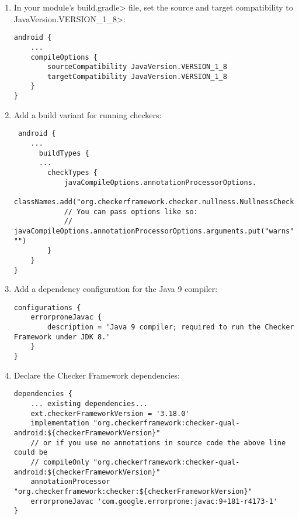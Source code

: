 \begin{enumerate}

\item In your module's \<build.gradle> file, set the source and target
  compatibility to \<JavaVersion.VERSION\_1\_8>:

\begin{Verbatim}
android {
    ...
    compileOptions {
        sourceCompatibility JavaVersion.VERSION_1_8
        targetCompatibility JavaVersion.VERSION_1_8
    }
}
\end{Verbatim}

\item Add a build variant for running checkers:

 \begin{Verbatim}
 android {
    ...
      buildTypes {
      ...
        checkTypes {
            javaCompileOptions.annotationProcessorOptions.
                    classNames.add("org.checkerframework.checker.nullness.NullnessChecker")
            // You can pass options like so:
            // javaCompileOptions.annotationProcessorOptions.arguments.put("warns", "")
        }
    }
}
\end{Verbatim}

\item Add a dependency configuration for the Java 9 compiler:

\begin{mysmall}
\begin{Verbatim}
configurations {
    errorproneJavac {
        description = 'Java 9 compiler; required to run the Checker Framework under JDK 8.'
    }
}

\end{Verbatim}
\end{mysmall}

\item Declare the Checker Framework dependencies:

\begin{mysmall}
\begin{Verbatim}
dependencies {
    ... existing dependencies...
    ext.checkerFrameworkVersion = '3.18.0'
    implementation "org.checkerframework:checker-qual-android:${checkerFrameworkVersion}"
    // or if you use no annotations in source code the above line could be
    // compileOnly "org.checkerframework:checker-qual-android:${checkerFrameworkVersion}"
    annotationProcessor "org.checkerframework:checker:${checkerFrameworkVersion}"
    errorproneJavac 'com.google.errorprone:javac:9+181-r4173-1'
}
\end{Verbatim}
\end{mysmall}


\end{enumerate}
